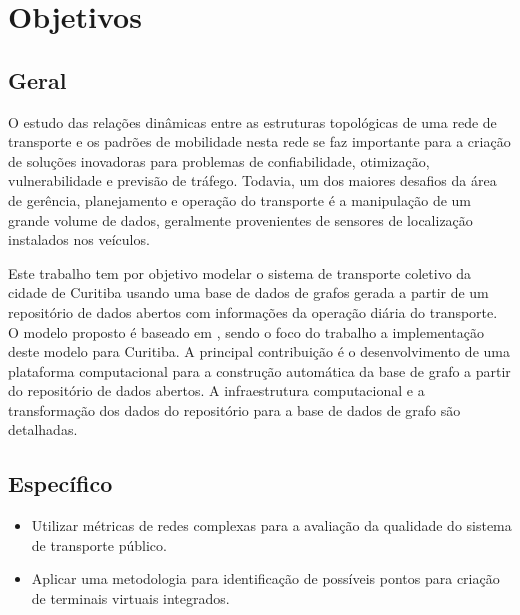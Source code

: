 

 \section{Objetivos}
 
 \subsection{Geral}

 O estudo das relações dinâmicas entre as estruturas topológicas de uma rede de transporte e os padrões de mobilidade nesta rede se faz importante para a criação de soluções inovadoras para problemas de confiabilidade, otimização, vulnerabilidade e previsão de tráfego. Todavia, um dos maiores desafios da área de gerência, planejamento e operação do transporte é a manipulação de um grande volume de dados, geralmente provenientes de sensores de localização instalados nos veículos. 
 
 Este trabalho tem por objetivo modelar o sistema de transporte coletivo da cidade de Curitiba usando uma base de dados de grafos gerada a partir de um repositório de dados abertos com informações da operação diária do transporte. O modelo proposto é baseado em \cite{wach:19}, sendo o foco do trabalho a implementação deste modelo para Curitiba. A principal contribuição é o desenvolvimento de uma plataforma computacional para a construção automática da base de grafo a partir do repositório de dados abertos. A infraestrutura computacional e a transformação dos dados do repositório para a base de dados de grafo são detalhadas. 
 
 \subsection{Específico}
 
 \begin{itemize}
 \item Utilizar métricas de redes complexas para a avaliação da qualidade do sistema de transporte público.
 
 \item Aplicar uma metodologia para identificação de possíveis pontos para criação de terminais virtuais integrados.
 \end{itemize}